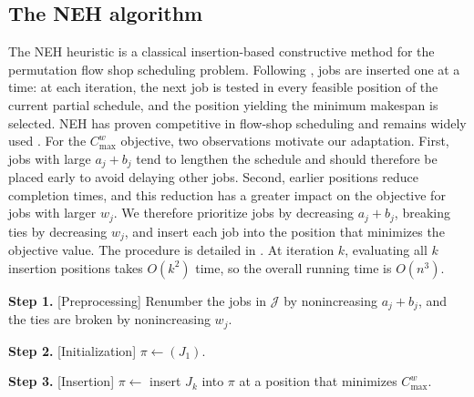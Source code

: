 \documentclass[12pt]{article} \textheight=24.5cm \textwidth=16.5cm \parskip = 0.165cm
\begin{document}
\begin{sloppypar}
        \subsection{The NEH algorithm} \label{sec:neh}
        
        The NEH heuristic is a classical insertion-based constructive method for the permutation flow shop scheduling problem. Following \cite{NawazEnscoreHam1983Omega}, jobs are inserted one at a time: at each iteration, the next job is tested in every feasible position of the current partial schedule, and the position yielding the minimum makespan is selected.
        NEH has proven competitive in flow-shop scheduling and remains widely used \citep{ShaoShaoPi2023ESWA, PukaSkalnaIwona2024COR, WangPanSang2024RCIM, WangPanGao2024CIE}. For the $C_{\max}^w$ objective, two observations motivate our adaptation. First, jobs with large $a_j+b_j$ tend to lengthen the schedule and should therefore be placed early to avoid delaying other jobs. Second, earlier positions reduce completion times, and this reduction has a greater impact on the objective for jobs with larger $w_j$. We therefore prioritize jobs by decreasing $a_j+b_j$, breaking ties by decreasing $w_j$, and insert each job into the position that minimizes the objective value. The procedure is detailed in . At iteration $k$, evaluating all $k$ insertion positions takes $O(k^2)$ time, so the overall running time is $O(n^3)$.
        
        \begin{algorithm}[H]
            \small
            \linespread{1.2}\selectfont
            \SetAlgoLined
            \DontPrintSemicolon
            \caption{NEH heuristic for $F2 \mid \mid C_{\max}^w$}\label{Alg-NEH}
            \BlankLine
            \textbf{Step 1.} [Preprocessing] Renumber the jobs in $\mathcal{J}$ by nonincreasing $a_j+b_j$, and the ties are broken by nonincreasing $w_j$.  \;
            
            \textbf{Step 2.} [Initialization] $\pi \gets (J_{1})$. \;
            
            \textbf{Step 3.} [Insertion] 
            {
                $\pi \gets$ insert $J_{k}$ into $\pi$ at a position that minimizes $C_{\max}^w$. \;
            }
        \end{algorithm}
        

\end{sloppypar}
\end{document}
